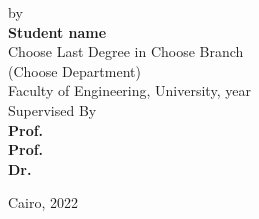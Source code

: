 \begin{center}
	
	\vfill
	\small
	by\\
	\large
	\textbf{Student name}\\
	\small
	Choose Last Degree in Choose Branch  \\
	(Choose Department)\\
	Faculty of Engineering, University, year\\
	
	
	
	
	
	
	
	\vfill
	\small
	Supervised By\\
	\normalsize
	\textbf{Prof.~\\
		Prof.~\\
		Dr.~}
	
	\vfill
	\small
	Cairo, 2022\\
	
\end{center}
